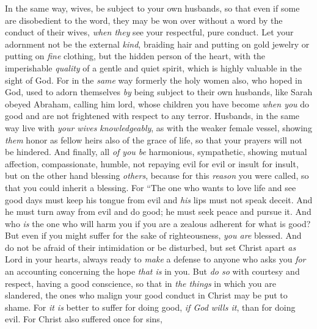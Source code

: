 \begin{biblechapter} %
 In the same way, wives, be subject to your own husbands, so that even if some are disobedient to the word, they may be won over without a word by the conduct of their wives,
\verse \textit{when they} see your respectful, pure conduct.
\verse Let your adornment not be the external \textit{kind}, braiding hair and putting on gold jewelry or putting on \textit{fine} clothing,
\verse but the hidden person of the heart, with the imperishable \textit{quality} of a gentle and quiet spirit, which is highly valuable in the sight of God.
\verse For in the \textit{same} way formerly the holy women also, who hoped in God, used to adorn themselves \textit{by} being subject to their own husbands,
\verse like Sarah obeyed Abraham, calling him lord, whose children you have become \textit{when you} do good and are not frightened with respect to any terror.
\verse Husbands, in the same way live with \textit{your wives} \textit{knowledgeably}, as with the weaker female vessel, showing \textit{them} honor as fellow heirs also of the grace of life, so that your prayers will not be hindered.
 And finally, all \textit{of you be} harmonious, sympathetic, showing mutual affection, compassionate, humble,
\verse not repaying evil for evil or insult for insult, but on the other hand blessing \textit{others}, because for this \textit{reason} you were called, so that you could inherit a blessing.
\verse For
\verse “The one who wants to love life 
and see good days 
must keep his tongue from evil 
and \textit{his} lips must not speak deceit.
\verse And he must turn away from evil and do good; 
he must seek peace and pursue it.
 And who \textit{is} the one who will harm you if you are a zealous adherent for what is good?
\verse But even if you might suffer for the sake of righteousness, \textit{you are} blessed. And do not be afraid of their intimidation or be disturbed,
\verse but set Christ apart \textit{as} Lord in your hearts, always ready to \textit{make} a defense to anyone who asks you \textit{for} an accounting concerning the hope \textit{that is} in you.
\verse But \textit{do so} with courtesy and respect, having a good conscience, so that in \textit{the things} in which you are slandered, the ones who malign your good conduct in Christ may be put to shame.
\verse For \textit{it is} better to suffer for doing good, \textit{if God wills it}, than for doing evil.
\verse For Christ also suffered once for sins, 

\end{biblechapter}

